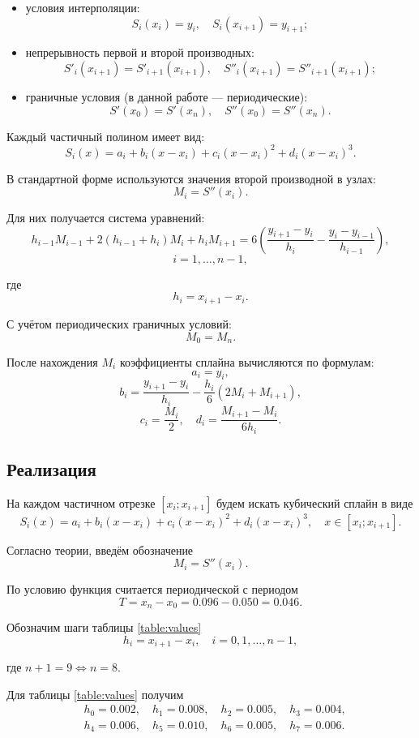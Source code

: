 \begin{itemize}
    \item условия интерполяции:
    \[
    S_i(x_i) = y_i, \quad S_i(x_{i+1}) = y_{i+1};
    \]

    \item непрерывность первой и второй производных:
    \[
    S'_i(x_{i+1}) = S'_{i+1}(x_{i+1}), \quad
    S''_i(x_{i+1}) = S''_{i+1}(x_{i+1});
    \]

    \item граничные условия (в данной работе — периодические):
    \[
    S'(x_0) = S'(x_n), \quad
    S''(x_0) = S''(x_n).
    \]
\end{itemize}

Каждый частичный полином имеет вид:
\[
S_i(x) = a_i + b_i(x - x_i) + c_i(x - x_i)^2 + d_i(x - x_i)^3.
\]

В стандартной форме используются значения второй производной в узлах:
\[
M_i = S''(x_i).
\]

Для них получается система уравнений:
\[
h_{i-1}M_{i-1} + 2(h_{i-1} + h_i)M_i + h_i M_{i+1}
=
6\left(
\frac{y_{i+1} - y_i}{h_i}
-
\frac{y_i - y_{i-1}}{h_{i-1}}
\right),
\]
\[
i = 1, \dots, n-1,
\]

где
\[
h_i = x_{i+1} - x_i.
\]

С учётом периодических граничных условий:
\[
M_0 = M_n.
\]

После нахождения $M_i$ коэффициенты сплайна вычисляются по формулам:
\[
a_i = y_i,
\]
\[
b_i =
\frac{y_{i+1} - y_i}{h_i}
- \frac{h_i}{6}(2M_i + M_{i+1}),
\]
\[
c_i = \frac{M_i}{2},
\quad
d_i = \frac{M_{i+1} - M_i}{6h_i}.
\]
\subsection{Реализация}

На каждом частичном отрезке $[x_i;x_{i+1}]$ будем искать кубический сплайн в виде
\[
S_i(x)=a_i+b_i(x-x_i)+c_i(x-x_i)^2+d_i(x-x_i)^3,
\quad x\in[x_i;x_{i+1}].
\]

Согласно теории, введём обозначение
\[
M_i=S''(x_i).
\]

По условию функция считается периодической с периодом
\[
T=x_n-x_0=0.096-0.050=0.046.
\]

Обозначим шаги таблицы \ref{table:values}
\[
h_i=x_{i+1}-x_i, \quad i=0,1,\dots,n-1,
\]

где $n + 1 = 9 \iff n = 8.$

\vspace{10pt}

Для таблицы \ref{table:values} получим
\[
\begin{aligned}
&h_0=0.002, \quad h_1=0.008, \quad h_2=0.005, \quad h_3=0.004,\\
&h_4=0.006, \quad h_5=0.010, \quad h_6=0.005, \quad h_7=0.006.
\end{aligned}
\]


